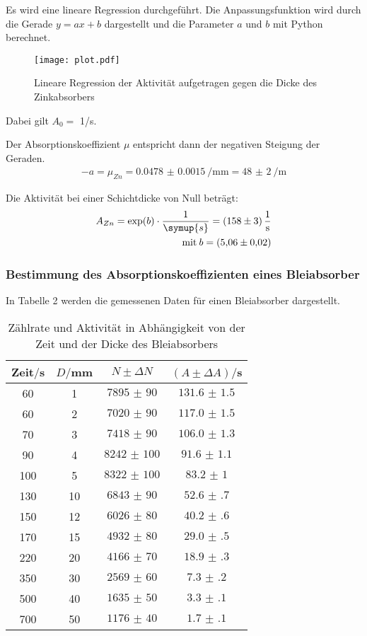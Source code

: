Es wird eine lineare Regression durchgeführt. Die Anpassungsfunktion wird durch die Gerade $y = ax + b$  dargestellt und die Parameter $a$ und $b$
mit Python berechnet.

\begin{figure}[H]
  \centering
  \texttt{[image: plot.pdf]}
  \caption{Lineare Regression der Aktivität aufgetragen gegen die Dicke des Zinkabsorbers}
  \label{fig:plot}
\end{figure}

Dabei gilt $A_0 =$ 1/s.

Der Absorptionskoeffizient $\mu$ entspricht dann der negativen Steigung der Geraden.
\begin{align*}
  -a = \mu_{Zn} = \SI{0.0478(15)}{\per\milli\meter} = \SI{48(2)}{\per\meter}
\end{align*}

Die Aktivität bei einer Schichtdicke von Null beträgt:
\begin{align*}
  A_{Zn} = \exp(b) \cdot \frac{1}{\symup{s}} = \SI{158(3)}{\per\second} \\
  \text{mit} \: b = \SI{5.06(2)}{}
\end{align*}

\subsubsection{Bestimmung des Absorptionskoeffizienten eines Bleiabsorber}

In Tabelle 2 werden die gemessenen Daten für einen Bleiabsorber dargestellt.

\begin{table}[H]
  \centering
  \caption{Zählrate und Aktivität in Abhängigkeit von der Zeit und der Dicke des Bleiabsorbers}
  \label{tab:Rechteckspannung}
  \begin{tabular}{c c c c}
    \toprule
    Zeit$/$s & $D/$mm & $N \pm \Delta N$ & $(A \pm \Delta A)/$s\\
    \midrule
    60 & 1 & $\num{7895(90)}$  &  $\num{131.6(15)}$ \\
    60 & 2 & $\num{7020(90)}$ &   $\num{117.0(15)}$ \\
    70 & 3 & $\num{7418(90)}$ &   $\num{106.0(13)}$ \\
    90 & 4 & $\num{8242(100)}$ &  $\num{91.6(11)}$ \\
    100 & 5 & $\num{8322(100)}$ & $\num{83.2(10)}$ \\
    130 & 10 & $\num{6843(90)}$ & $\num{52.6(7)}$ \\
    150 & 12 & $\num{6026(80)}$ & $\num{40.2(6)}$ \\
    170 & 15 & $\num{4932(80)}$ & $\num{29.0(5)}$ \\
    220 & 20 & $\num{4166(70)}$ & $\num{18.9(3)}$ \\
    350 & 30 & $\num{2569(60)}$ & $\num{7.3(2)}$ \\
    500 & 40 & $\num{1635(50)}$ & $\num{3.3(1)}$ \\
    700 & 50 & $\num{1176(40)}$ & $\num{1.7(1)}$ \\
    \bottomrule
  \end{tabular}
\end{table}

